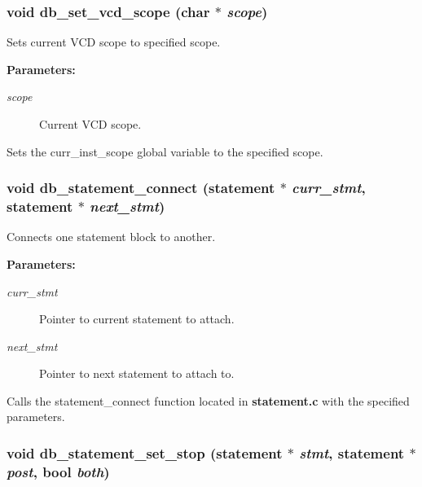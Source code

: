 \subsubsection{\setlength{\rightskip}{0pt plus 5cm}void db\_\-set\_\-vcd\_\-scope (char $\ast$ {\em scope})}\label{db_8h_a20}


Sets current VCD scope to specified scope.

\begin{Desc}
\item[{\bf Parameters: }]\par
\begin{description}
\item[
{\em scope}]Current VCD scope.

\end{description}
\end{Desc}
Sets the curr\_\-inst\_\-scope global variable to the specified scope. 
\subsubsection{\setlength{\rightskip}{0pt plus 5cm}void db\_\-statement\_\-connect ({\bf statement} $\ast$ {\em curr\_\-stmt}, {\bf statement} $\ast$ {\em next\_\-stmt})}\label{db_8h_a16}


Connects one statement block to another.

\begin{Desc}
\item[{\bf Parameters: }]\par
\begin{description}
\item[
{\em curr\_\-stmt}]Pointer to current statement to attach. \item[
{\em next\_\-stmt}]Pointer to next statement to attach to.

\end{description}
\end{Desc}
Calls the statement\_\-connect function located in {\bf statement.c} with the specified parameters. 
\subsubsection{\setlength{\rightskip}{0pt plus 5cm}void db\_\-statement\_\-set\_\-stop ({\bf statement} $\ast$ {\em stmt}, {\bf statement} $\ast$ {\em post}, {\bf bool} {\em both})}\label{db_8h_a17}


